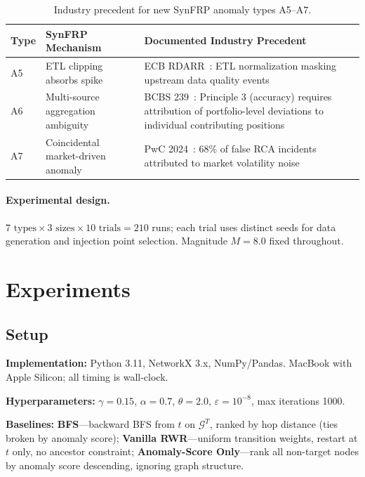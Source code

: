 \documentclass{article}
\begin{document}
\begin{table}[h]
  \centering
  \caption{Industry precedent for new SynFRP anomaly types A5--A7.}
  \label{tab:precedent}
  \small
  \begin{tabular}{llp{6cm}}
    \toprule
    Type & SynFRP Mechanism & Documented Industry Precedent \\
    \midrule
    A5 & ETL clipping absorbs spike &
      ECB RDARR~\cite{ecb2024rdarr}: ETL normalization masking upstream data quality events \\
    A6 & Multi-source aggregation ambiguity &
      BCBS 239~\cite{bis2013bcbs239}: Principle 3 (accuracy) requires attribution of portfolio-level deviations to individual contributing positions \\
    A7 & Coincidental market-driven anomaly &
      PwC 2024~\cite{pwc2024bcbs}: 68\% of false RCA incidents attributed to market volatility noise \\
    \bottomrule
  \end{tabular}
\end{table}

\paragraph{Experimental design.}
$7 \text{ types} \times 3 \text{ sizes} \times 10 \text{ trials} = 210$
runs; each trial uses distinct seeds for data generation and injection point
selection. Magnitude $M = 8.0$ fixed throughout.

\section{Experiments}
\label{sec:experiments}

\subsection{Setup}

\textbf{Implementation:} Python 3.11, NetworkX 3.x, NumPy/Pandas.
MacBook with Apple Silicon; all timing is wall-clock.

\textbf{Hyperparameters:} $\gamma = 0.15$, $\alpha = 0.7$,
$\theta = 2.0$, $\varepsilon = 10^{-8}$, max iterations 1000.

\textbf{Baselines:}
\textbf{BFS}---backward BFS from $t$ on $\mathcal{G}^T$, ranked by hop
distance (ties broken by anomaly score);
\textbf{Vanilla RWR}---uniform transition weights, restart at $t$ only, no
ancestor constraint;
\textbf{Anomaly-Score Only}---rank all non-target nodes by anomaly score
descending, ignoring graph structure.
\end{document}
